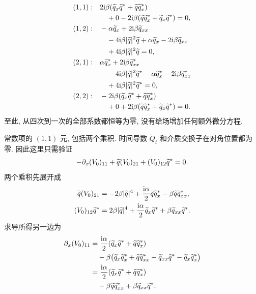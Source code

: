 \begin{align*}
(1,1):\quad
&2\mathrm{i}\beta(\widetilde q_x{\widetilde q}^{*}
+\widetilde q{\widetilde q_x}^{*})\\
&\quad+0
-2\mathrm{i}\beta(\widetilde q{\widetilde q_x}^{*}
+\widetilde q_x{\widetilde q}^{*})=0,\\
(1,2):\quad
&-\alpha\widetilde q_x+2\mathrm{i}\beta\widetilde q_{xx}\\
&\quad-4\mathrm{i}\beta|\widetilde q|^2\widetilde q
+\alpha\widetilde q_x-2\mathrm{i}\beta\widetilde q_{xx}\\
&\quad+4\mathrm{i}\beta|\widetilde q|^2\widetilde q=0,\\
(2,1):\quad
&\alpha{\widetilde q_x}^{*}
+2\mathrm{i}\beta{\widetilde q_{xx}}^{*}\\
&\quad-4\mathrm{i}\beta|\widetilde q|^2{\widetilde q}^{*}
-\alpha{\widetilde q_x}^{*}
-2\mathrm{i}\beta{\widetilde q_{xx}}^{*}\\
&\quad+4\mathrm{i}\beta|\widetilde q|^2{\widetilde q}^{*}=0,\\
(2,2):\quad
&-2\mathrm{i}\beta(\widetilde q_x{\widetilde q}^{*}
+\widetilde q{\widetilde q_x}^{*})\\
&\quad+0
+2\mathrm{i}\beta(\widetilde q{\widetilde q_x}^{*}
+\widetilde q_x{\widetilde q}^{*})=0.
\end{align*}
至此, 从四次到一次的全部系数都恒等为零, 没有给场增加任何额外微分方程.
\par\smallskip\noindent 常数项的 $(1,1)$ 元, 包括两个乘积.\quad
时间导数 $\widetilde Q_t$ 和介质交换子在对角位置都为零. 因此这里只需验证
\begin{equation*}
-\partial_x(V_0)_{11}
+\widetilde q(V_0)_{21}
+(V_0)_{12}{\widetilde q}^{*}=0.
\end{equation*}
两个乘积先展开成
\begin{align*}
\widetilde q(V_0)_{21}
&=-2\beta|\widetilde q|^4
+\dfrac{\mathrm{i}\alpha}{2}\widetilde q{\widetilde q_x}^{*}
-\beta\widetilde q{\widetilde q_{xx}}^{*},\\
(V_0)_{12}{\widetilde q}^{*}
&=2\beta|\widetilde q|^4
+\dfrac{\mathrm{i}\alpha}{2}\widetilde q_x{\widetilde q}^{*}
+\beta\widetilde q_{xx}{\widetilde q}^{*}.
\end{align*}
求导所得另一边为
\begin{align*}
\partial_x(V_0)_{11}
&=\dfrac{\mathrm{i}\alpha}{2}
(\widetilde q_x{\widetilde q}^{*}
+\widetilde q{\widetilde q_x}^{*})\\
&\quad-\beta\bigl(
\widetilde q_x{\widetilde q_x}^{*}
+\widetilde q{\widetilde q_{xx}}^{*}
-\widetilde q_{xx}{\widetilde q}^{*}
-\widetilde q_x{\widetilde q_x}^{*}\bigr)\\
&=\dfrac{\mathrm{i}\alpha}{2}
(\widetilde q_x{\widetilde q}^{*}
+\widetilde q{\widetilde q_x}^{*})\\
&\quad-\beta\widetilde q{\widetilde q_{xx}}^{*}
+\beta\widetilde q_{xx}{\widetilde q}^{*}.
\end{align*}
